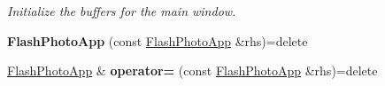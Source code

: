 \begin{DoxyCompactItemize}
\begin{DoxyCompactList}\small\item\em Initialize the buffers for the main window. \end{DoxyCompactList}\item 
{\bfseries Flash\+Photo\+App} (const \hyperlink{classimage__tools_1_1FlashPhotoApp}{Flash\+Photo\+App} \&rhs)=delete\hypertarget{classimage__tools_1_1FlashPhotoApp_a3009fefcee5cd98e46e6b4dc3b3cf6be}{}\label{classimage__tools_1_1FlashPhotoApp_a3009fefcee5cd98e46e6b4dc3b3cf6be}

\item 
\hyperlink{classimage__tools_1_1FlashPhotoApp}{Flash\+Photo\+App} \& {\bfseries operator=} (const \hyperlink{classimage__tools_1_1FlashPhotoApp}{Flash\+Photo\+App} \&rhs)=delete\hypertarget{classimage__tools_1_1FlashPhotoApp_a9ecfbf7bd80d0ef20ba5cf6b61538699}{}\label{classimage__tools_1_1FlashPhotoApp_a9ecfbf7bd80d0ef20ba5cf6b61538699}

\end{DoxyCompactItemize}
